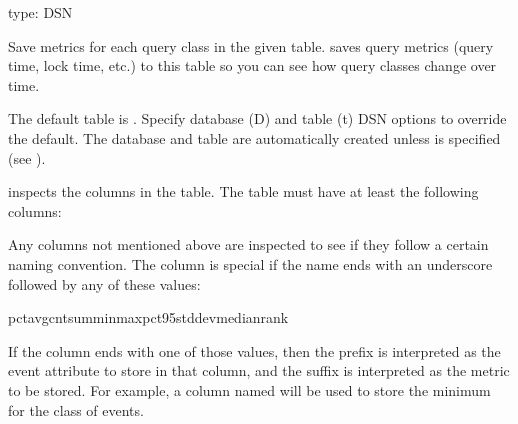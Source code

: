 \documentclass[letterpaper,10pt,english]{sphinxmanual}
\begin{document}
\begin{fulllineitems}
\label{\detokenize{mariadb-query-digest:cmdoption-mariadb-query-digest-history}}
type: DSN

Save metrics for each query class in the given table.   saves
query metrics (query time, lock time, etc.) to this table so you can see how
query classes change over time.

The default table is .  Specify database
(D) and table (t) DSN options to override the default.  The database and
table are automatically created unless 
is specified (see {\hyperref[\detokenize{mariadb-query-digest:cmdoption-mariadb-query-digest-no-create-history-table}]{}}).

 inspects the columns in the table.  The table must have at
least the following columns:

\begin{sphinxVerbatim}[commandchars=\\\{\}]
   
         
           
\end{sphinxVerbatim}

Any columns not mentioned above are inspected to see if they follow a certain
naming convention.  The column is special if the name ends with an underscore
followed by any of these values:

\begin{sphinxVerbatim}[commandchars=\\\{\}]
pctavgcntsumminmaxpct\PYGZus{}95stddevmedianrank
\end{sphinxVerbatim}

If the column ends with one of those values, then the prefix is interpreted as
the event attribute to store in that column, and the suffix is interpreted as
the metric to be stored.  For example, a column named  will be
used to store the minimum  for the class of events.


\end{fulllineitems}
\end{document}
